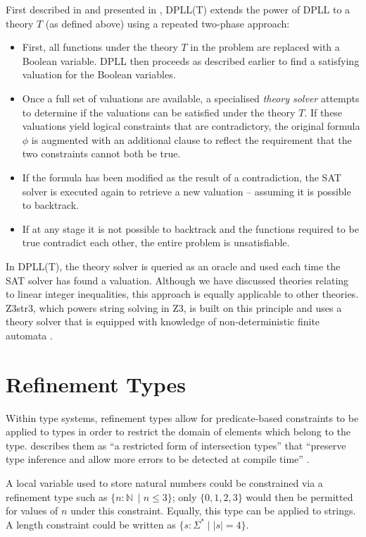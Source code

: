 \documentclass[a4paper,openany]{book}
\begin{document}
First described in \citet{ganzinger2004dpll} and presented in \citet{presdpllt}, DPLL(T) extends the power of DPLL to a theory $T$ (as defined above) using a repeated two-phase approach:

\begin{itemize}
	\item First, all functions under the theory $T$ in the problem are replaced with a Boolean variable. DPLL then proceeds as described earlier to find a satisfying valuation for the Boolean variables.
	\item Once a full set of valuations are available, a specialised \emph{theory solver} attempts to determine if the valuations can be satisfied under the theory $T$. If these valuations yield logical constraints that are contradictory, the original formula $\phi$ is augmented with an additional clause to reflect the requirement that the two constraints cannot both be true.
	\item If the formula has been modified as the result of a contradiction, the SAT solver is executed again to retrieve a new valuation -- assuming it is possible to backtrack.
	\item If at any stage it is not possible to backtrack and the functions required to be true contradict each other, the entire problem is unsatisfiable.
\end{itemize}

In DPLL(T), the theory solver is queried as an oracle and used each time the SAT solver has found a valuation. Although we have discussed theories relating to linear integer inequalities, this approach is equally applicable to other theories. Z3str3, which powers string solving in Z3, is built on this principle and uses a theory solver that is equipped with knowledge of non-deterministic finite automata \citep{berzish2017z3str3}.

\section{Refinement Types}

Within type systems, refinement types allow for predicate-based constraints to be applied to types in order to restrict the domain of elements which belong to the type. \citeauthor{benjaminpierce2002} describes them as ``a restricted form of intersection types'' that ``preserve type inference and allow more errors to be detected at compile time'' \citeyearpar{benjaminpierce2002}.

A local variable used to store natural numbers could be constrained via a refinement type such as $\{n: \mathbb{N}\ \mid n \leq 3\}$; only $\{0, 1, 2, 3\}$ would then be permitted for values of $n$ under this constraint. Equally, this type can be applied to strings. A length constraint could be written as $\{s : \Sigma^* \mid \left| s \right| = 4 \}$.
\end{document}
